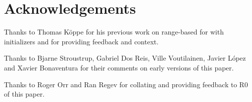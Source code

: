\section*{Acknowledgements}

Thanks to Thomas Köppe for his previous work on range-based for with
initializers and for providing feedback and context.

Thanks to Bjarne Stroustrup, Gabriel Dos Reis, Ville Voutilainen, Javier López
and Xavier Bonaventura for their
comments on early versions of this paper.

Thanks to Roger Orr and Ran Regev for collating and providing feedback to R0 of
this paper.
